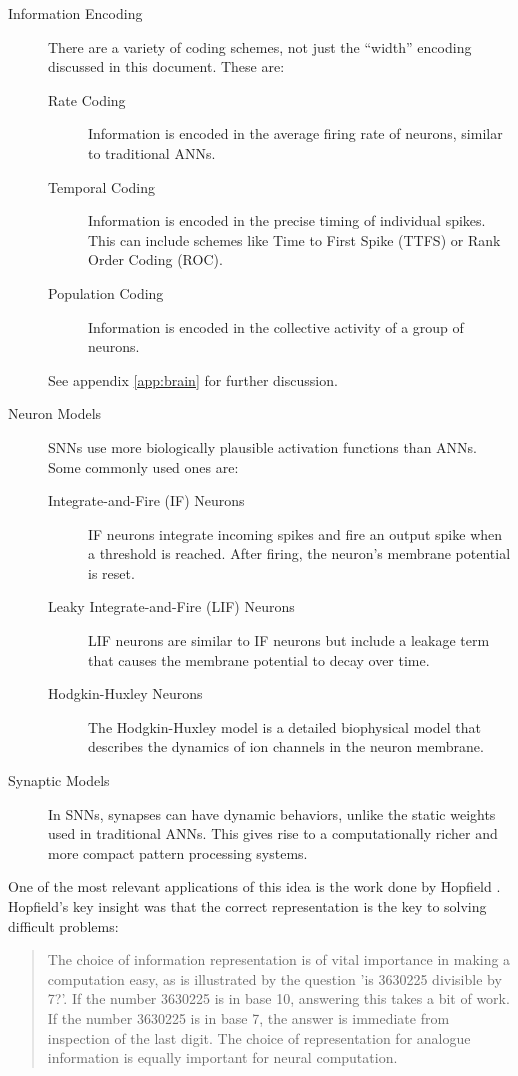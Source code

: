 \documentclass{article}
\begin{document}
\begin{description}
\item[Information Encoding] There are a variety of coding schemes, not just the ``width'' encoding discussed in this document. These are: 
\begin{description}
\item[Rate Coding] Information is encoded in the average firing rate of neurons, similar to traditional ANNs.
\item[Temporal Coding] Information is encoded in the precise timing of individual spikes. This can include schemes like Time to First Spike (TTFS) or Rank Order Coding (ROC).
\item[Population Coding] Information is encoded in the collective activity of a group of neurons.
\end{description}
See appendix \ref{app:brain} for further discussion.

\item[Neuron Models] SNNs use more biologically plausible activation functions than ANNs. Some commonly used ones are:
\begin{description}
\item[Integrate-and-Fire (IF) Neurons] \cite{burkitt2006review} IF neurons integrate incoming spikes and fire an output spike when a threshold is reached. After firing, the neuron's membrane potential is reset.
\item[Leaky Integrate-and-Fire (LIF) Neurons] \cite{tal1997computing} LIF neurons are similar to IF neurons but include a leakage term that causes the membrane potential to decay over time.
\item[Hodgkin-Huxley Neurons] \cite{y2003computation} The Hodgkin-Huxley model is a detailed biophysical model that describes the dynamics of ion channels in the neuron membrane.
\end{description}
\item[Synaptic Models] In SNNs, synapses can have dynamic behaviors, unlike the static weights used in traditional ANNs. This gives rise to a computationally richer and more compact pattern processing systems.
\end{description}

One of the most relevant applications of this idea is the work done by Hopfield \cite{hopfield1995pattern}. Hopfield's key insight was that the correct representation is the key to solving difficult problems:

\begin{quote}
The choice of information representation is of vital importance in making a computation easy, as is illustrated by the question 'is 3630225 divisible by 7?'. If the number 3630225 is in base 10, answering this takes a bit of work. If the number 3630225 is in base 7, the answer is immediate from inspection of the last digit. The choice of representation for analogue information is equally important for neural computation. \cite{hopfield1995pattern}
\end{quote}
\end{document}
